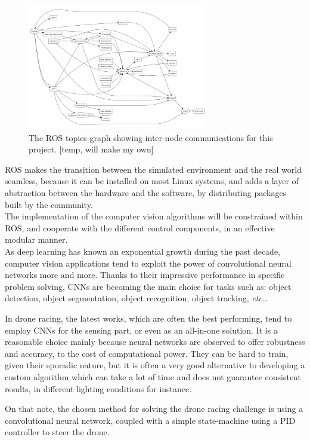 \begin{figure}[h]
	\centering
	\includegraphics[width=0.7\textwidth]{figure/ros_topics.png}
	\caption{The ROS topics graph showing inter-node communications for this
	project. [temp, will make my own]}
	\label{fig:ros-topics}
\end{figure}

ROS makes the transition between the simulated environment and the real world
seamless, because it can be installed on most Linux systems, and adds a layer
of abstraction between the hardware and the software, by distributing packages
built by the community.\\

The implementation of the computer vision algorithms will be constrained within
ROS, and cooperate with the different control components, in an effective
modular manner.\\

As deep learning has known an exponential growth during the past decade,
computer vision applications tend to exploit the power of convolutional neural
networks more and more. Thanks to their impressive performance in specific
problem solving, CNNs are becoming the main choice for tasks such as: object
detection, object segmentation, object recognition, object tracking,
\emph{etc}\ldots

In drone racing, the latest works, which are often the best performing, tend to
employ CNNs for the sensing part, or even as an all-in-one solution. It is a
reasonable choice mainly because neural networks are observed to offer
robustness and accuracy, to the cost of computational power. They can be hard
to train, given their sporadic nature, but it is often a very good alternative
to developing a custom algorithm which can take a lot of time and does not
guarantee consistent results, in different lighting conditions for instance.

On that note, the chosen method for solving the drone racing challenge is
using a convolutional neural network, coupled with a simple state-machine 
using a PID controller to steer the drone.
